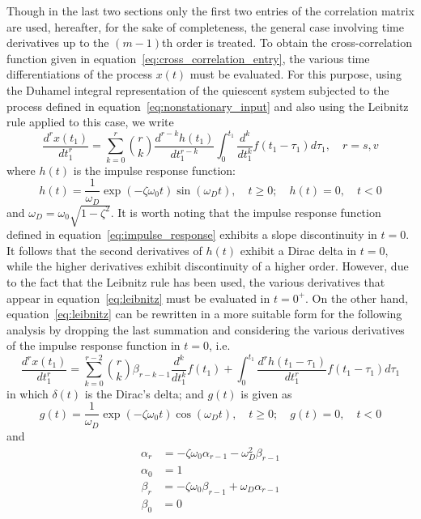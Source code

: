 \documentclass[11pt]{article}
\begin{document}
Though in the last two sections only the first two entries of the correlation matrix are used, hereafter, for the sake of completeness, the general case involving time derivatives up to the $(m-1)$th order is treated. To obtain the cross-correlation function given in equation~\eqref{eq:cross_correlation_entry}, the various time differentiations of the process $x(t)$ must be evaluated. For this purpose, using the Duhamel integral representation of the quiescent system subjected to the process defined in equation~\eqref{eq:nonstationary_input} and also using the Leibnitz rule applied to this case, we write
\begin{equation}
\frac{d^r x(t_1)}{dt_1^r} = \sum_{k=0}^{r} \binom{r}{k} \frac{d^{r-k} h(t_1)}{dt_1^{r-k}} \int_0^{t_1} \frac{d^k}{dt_1^k} f(t_1 - \tau_1) d\tau_1, \quad r = s,v
\label{eq:leibnitz}
\end{equation}
where $h(t)$ is the impulse response function:
\begin{equation}
h(t) = \frac{1}{\omega_D} \exp(-\zeta\omega_0 t) \sin(\omega_D t), \quad t \geq 0; \quad h(t) = 0, \quad t < 0
\label{eq:impulse_response}
\end{equation}
and $\omega_D = \omega_0\sqrt{1-\zeta^2}$. It is worth noting that the impulse response function defined in equation~\eqref{eq:impulse_response} exhibits a slope discontinuity in $t = 0$. It follows that the second derivatives of $h(t)$ exhibit a Dirac delta in $t = 0$, while the higher derivatives exhibit discontinuity of a higher order. However, due to the fact that the Leibnitz rule has been used, the various derivatives that appear in equation~\eqref{eq:leibnitz} must be evaluated in $t = 0^+$. On the other hand, equation~\eqref{eq:leibnitz} can be rewritten in a more suitable form for the following analysis by dropping the last summation and considering the various derivatives of the impulse response function in $t = 0$, i.e.
\begin{equation}
\frac{d^r x(t_1)}{dt_1^r} = \sum_{k=0}^{r-2} \binom{r}{k} \beta_{r-k-1} \frac{d^k}{dt_1^k} f(t_1) + \int_0^{t_1} \frac{d^r h(t_1 - \tau_1)}{dt_1^r} f(t_1 - \tau_1) d\tau_1
\label{eq:derivative_form}
\end{equation}
in which $\delta(t)$ is the Dirac's delta; and $g(t)$ is given as
\begin{equation}
g(t) = \frac{1}{\omega_D} \exp(-\zeta\omega_0 t) \cos(\omega_D t), \quad t \geq 0; \quad g(t) = 0, \quad t < 0
\label{eq:g_function}
\end{equation}
and
\begin{align}
\alpha_r &= -\zeta\omega_0 \alpha_{r-1} - \omega_D^2 \beta_{r-1} \label{eq:alpha_recursion}\\
\alpha_0 &= 1 \label{eq:alpha_initial}
\end{align}
\begin{align}
\beta_r &= -\zeta\omega_0 \beta_{r-1} + \omega_D \alpha_{r-1} \label{eq:beta_recursion}\\
\beta_0 &= 0 \label{eq:beta_initial}
\end{align}
\end{document}
